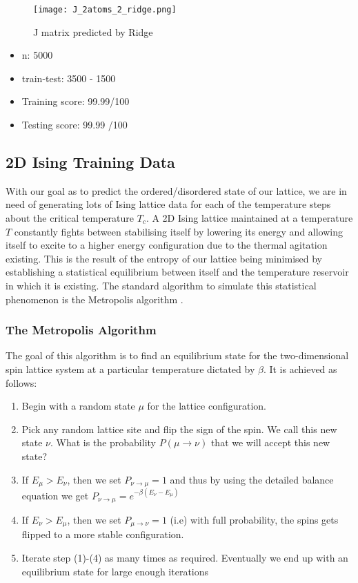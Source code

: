 \begin{figure}[H]
    \centering
    \texttt{[image: J\_2atoms\_2\_ridge.png]}
    \caption{J matrix predicted by Ridge}
\end{figure}

\begin{itemize}
    \item n: 5000
    \item train-test: 3500 - 1500
    \item Training score: 99.99/100
    \item Testing score: 99.99 /100
\end{itemize}

\subsection{2D Ising Training Data}
With our goal as to predict the ordered/disordered state of our lattice, we are in need of generating lots of Ising lattice data for each of the temperature steps about the critical temperature \(T_c\).
A 2D Ising lattice maintained at a temperature $T$ constantly fights between stabilising itself by lowering its energy and allowing itself to excite to a higher energy configuration due to the thermal agitation existing.
This is the result of the entropy of our lattice being minimised by establishing a statistical equilibrium between itself and the temperature reservoir in which it is existing.
The standard algorithm to simulate this statistical phenomenon is the Metropolis algorithm \cite{zhaodetermining}.

\subsubsection{The Metropolis Algorithm}
The goal of this algorithm is to find an equilibrium state for the two-dimensional spin lattice system at a particular temperature dictated by \(\beta\). It is achieved as follows:
\begin{enumerate}
    \item Begin with a random state \(\mu\) for the lattice configuration.
    \item Pick any random lattice site and flip the sign of the spin. We call this new state \(\nu\). What is the probability $P(\mu \rightarrow \nu)$ that we will accept this new state?
    \item If \(E_{\mu}>E_{\nu}\), then we set $P_{\nu \rightarrow \mu} = 1$ and thus by using the detailed balance equation we get $P_{\nu \rightarrow \mu} =e^{-\beta(E_{\nu}-E_{\mu})}$
    \item If $E_{\nu}>E_{\mu}$, then we set $P_{\mu \rightarrow \nu} = 1$ (i.e) with full probability, the spins gets flipped to a more stable configuration.
    \item Iterate step (1)-(4) as many times as required. Eventually we end up with an equilibrium state for large enough iterations
\end{enumerate}

